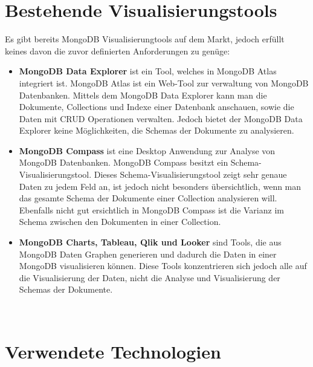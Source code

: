 \iffalse
Auf der Basis der im vorangegangenen Kapitel erstellten Problemanalyse 
und der im Grundlagenkapitel aufgearbeiteten theoretischen Kenntnisse 
wird ein Lösungskonzept erarbeitet.

Bei Software-Projekten entspricht dieses Kapitel typischerweise der 
Analyse \& Design-Phase des \ac{rup}. Typische Ergebnisse dieser Phase sind 
Klassendiagramme etc.
\fi

\section{Bestehende Visualisierungstools}
\label{sec:bestehende_visualisierungstools}

Es gibt bereits MongoDB Visualisierungtools auf dem Markt, jedoch erfüllt keines davon die zuvor definierten Anforderungen zu genüge:

\begin{itemize}
    \item \textbf{MongoDB Data Explorer} ist ein Tool, welches in MongoDB Atlas integriert ist.
        MongoDB Atlas ist ein Web-Tool zur verwaltung von MongoDB Datenbanken.
        Mittels dem MongoDB Data Explorer kann man die Dokumente, Collections und Indexe einer Datenbank anschauen, sowie die Daten mit CRUD Operationen verwalten.
        Jedoch bietet der MongoDB Data Explorer keine Möglichkeiten, die Schemas der Dokumente zu analysieren.
    \item \textbf{MongoDB Compass} ist eine Desktop Anwendung zur Analyse von MongoDB Datenbanken.
        MongoDB Compass besitzt ein Schema-Visualisierungstool.
        Dieses Schema-Visualisierungstool zeigt sehr genaue Daten zu jedem Feld an, ist jedoch nicht besonders übersichtlich, wenn man das gesamte Schema der Dokumente einer Collection analysieren will.
        Ebenfalls nicht gut ersichtlich in MongoDB Compass ist die Varianz im Schema zwischen den Dokumenten in einer Collection.
    \item \textbf{MongoDB Charts, Tableau, Qlik und Looker} sind Tools, die aus MongoDB Daten Graphen generieren und dadurch die Daten in einer MongoDB visualisieren können.
        Diese Tools konzentrieren sich jedoch alle auf die Visualisierung der Daten, nicht die Analyse und Visualisierung der Schemas der Dokumente.
\end{itemize}
~\autocite{knowi:mongo_vis_tools}

\section{Verwendete Technologien}
\label{sec:verwendete_technologien}

